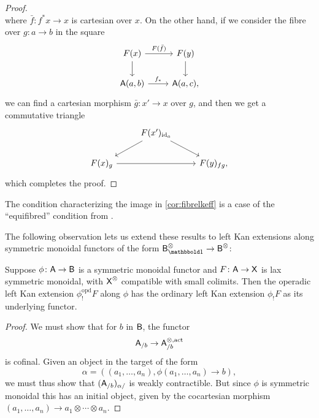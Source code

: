 \documentclass[a4paper,11pt]{article}
\begin{document}
\begin{proof}
\[  \]
  where $\bar{f}\colon f^{*}x \to x$ is cartesian over $x$. On the
  other hand, if we consider the fibre over $g \colon a \to b$
  in the square
    \[
    \begin{tikzcd}
      F(x) \ar[r, "F(\bar{f})"] \ar[d] & F(y) \ar[d]  \\
      \oA(a,b) \ar[r, "f_{*}"] & \oA(a,c),
    \end{tikzcd}
  \]
  we can find a cartesian morphism $\bar{g} \colon x' \to x$ over $g$,
  and then we get a commutative triangle
  \[
    \begin{tikzcd}
      & F(x')_{\id_{a}} \ar[dl] \ar[dr] \\
      F(x)_{g} \ar[rr] & & F(y)_{fg},
    \end{tikzcd}
  \]
  which completes the proof.
\end{proof}

\begin{remark}
  The condition characterizing the image in \cref{cor:fibrelkeff} is a
  case of the ``equifibred'' condition from \cite[Proposition 2.3.3]{envelopes}.
\end{remark}

The following observation lets us extend these results to left Kan extensions along symmetric
monoidal functors of the form $\oB_{\bbone}^{\otimes} \to \oB^{\otimes}$:
\begin{lemma}\label{lem:opd lke ordinary}
  Suppose $\phi \colon \oA \to \oB$ is a symmetric monoidal functor
  and $F \colon \oA \to \uX$ is lax symmetric monoidal, with
  $\textup{\textsf{X}}^{\otimes}$ compatible with small colimits. Then the operadic
  left Kan extension $\phi_{!}^{\mathrm{opd}}F$ along $\phi$ has the
  ordinary left Kan extension $\phi_{!}F$ as its underlying functor.
\end{lemma}
\begin{proof}
  We must show that for $b$ in $\textup{\textsf{B}}$, the functor
  \[ \oA_{/b} \to \oA^{\otimes,\act}_{/b} \] is cofinal. Given an
  object in the target of the form
  \[\alpha = ((a_{1},\ldots,a_{n}), \phi(a_{1}, \ldots, a_{n}) \to b),\]
  we must thus show that $(\textup{\textsf{A}}_{/b})_{\alpha/}$ is weakly
  contractible. But since $\phi$ is symmetric monoidal 
  this has an initial object, given by the cocartesian morphism
  $(a_{1},\ldots,a_{n}) \to a_{1} \otimes \cdots \otimes a_{n}$.
\end{proof}
\end{document}
